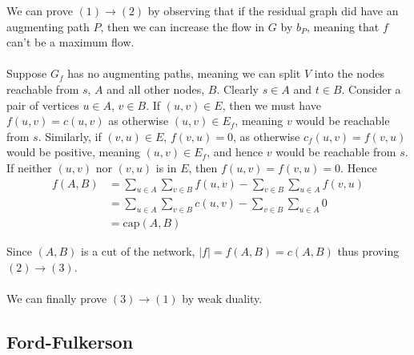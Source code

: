 \documentclass{article}
\theoremstyle{plain}
\theoremstyle{definition}
\begin{document}
        We can prove $(1) \to (2)$ by observing that if the residual graph did have an augmenting path $P$, then we can increase the flow in $G$ by $b_P$, meaning that $f$ can't be a maximum flow. \\ \\
        Suppose $G_f$ has no augmenting paths, meaning we can split $V$ into the nodes reachable from $s$, $A$ and all other nodes, $B$.  Clearly $s \in A$ and $t \in B$. Consider a pair of vertices $u \in A$, $v \in B$. If $(u,v) \in E$, then we must have $f(u,v) = c(u,v)$ as otherwise $(u,v) \in E_f$, meaning $v$ would be reachable from $s$. Similarly, if $(v,u) \in E$, $f(v,u) = 0$, as otherwise $c_f(u,v) = f(v, u)$ would be positive, meaning $(u,v) \in E_f$, and hence $v$ would be reachable from $s$. If neither $(u,v)$ nor $(v,u)$ is in $E$, then $f(u,v) = f(v,u) = 0$. Hence
        \begin{align*}
            f(A,B) &= \sum_{u \in A} \sum_{v \in B} f(u,v) - \sum_{v \in B} \sum_{u \in A} f(v,u) \\ 
            &= \sum_{u \in A} \sum_{v \in B} c(u,v) - \sum_{v \in B} \sum_{u \in A} 0 \\
            &= \text{cap}(A,B)
        \end{align*}

        Since $(A,B)$ is a cut of the network, $|f| = f(A,B) = c(A,B)$ thus proving $(2) \to (3)$. \\ \\
        We can finally prove $(3) \to (1)$ by weak duality. 
    
    \subsection{Ford-Fulkerson}
\end{document}
